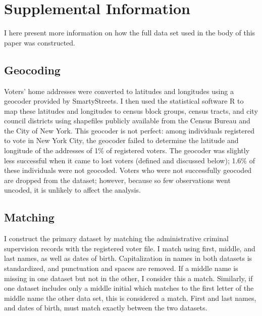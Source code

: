 \documentclass[
  12pt,
]{article}
\begin{document}
\newpage

\hypertarget{supplemental-information}{%
\section*{Supplemental Information}\label{supplemental-information}}

I here present more information on how the full data set used in the body of this paper was constructed.

\hypertarget{geocoding}{%
\subsection*{Geocoding}\label{geocoding}}

Voters' home addresses were converted to latitudes and longitudes using a geocoder provided by SmartyStreets. I then used the statistical software R to map these latitudes and longitudes to census block groups, census tracts, and city council districts using shapefiles publicly available from the Census Bureau and the City of New York. This geocoder is not perfect: among individuals registered to vote in New York City, the geocoder failed to determine the latitude and longitude of the addresses of 1\% of registered voters. The geocoder was slightly less successful when it came to lost voters (defined and discussed below); 1.6\% of these individuals were not geocoded. Voters who were not successfully geocoded are dropped from the dataset; however, because so few observations went uncoded, it is unlikely to affect the analysis.

\hypertarget{matching}{%
\subsection*{Matching}\label{matching}}

I construct the primary dataset by matching the administrative criminal supervision records with the registered voter file. I match using first, middle, and last names, as well as dates of birth. Capitalization in names in both datasets is standardized, and punctuation and spaces are removed. If a middle name is missing in one dataset but not in the other, I consider this a match. Similarly, if one dataset includes only a middle initial which matches to the first letter of the middle name the other data set, this is considered a match. First and last names, and dates of birth, must match exactly between the two datasets.
\end{document}
